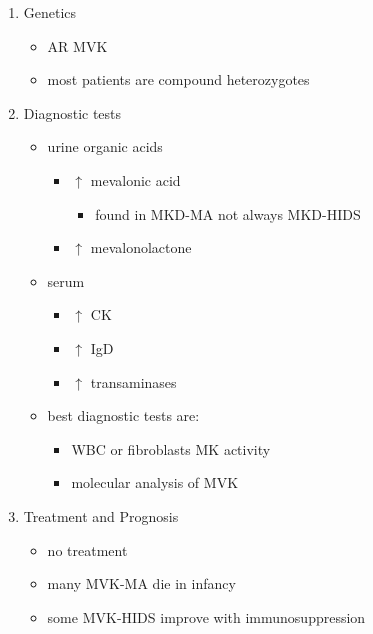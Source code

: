 \documentclass[12pt]{scrartcl}
\begin{document}
\begin{enumerate}
\item Genetics
\label{sec:orgea5678a}
\begin{itemize}
\item AR MVK
\item most patients are compound heterozygotes
\end{itemize}

\item Diagnostic tests
\label{sec:org7e896b4}
\begin{itemize}
\item urine organic acids
\begin{itemize}
\item \(\uparrow\) mevalonic acid
\begin{itemize}
\item found in MKD-MA not always MKD-HIDS
\end{itemize}
\item \(\uparrow\) mevalonolactone
\end{itemize}
\item serum
\begin{itemize}
\item \(\uparrow\) CK
\item \(\uparrow\) IgD
\item \(\uparrow\) transaminases
\end{itemize}
\item best diagnostic tests are:
\begin{itemize}
\item WBC or fibroblasts MK activity
\item molecular analysis of MVK
\end{itemize}
\end{itemize}

\item Treatment and Prognosis
\label{sec:org930348d}
\begin{itemize}
\item no treatment
\item many MVK-MA die in infancy
\item some MVK-HIDS improve with immunosuppression
\end{itemize}
\end{enumerate}
\end{document}
